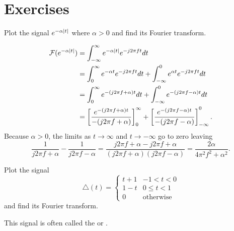 \section*{Exercises}


\begin{excersizelist}

\item \label{exer:fourtransealphaabs} Plot the signal $e^{-\alpha\left\vert t \right\vert}$ where $\alpha > 0$ and find its Fourier transform.
\begin{solution}
\begin{align*}
{\mathcal F}(e^{-\alpha\left\vert t \right\vert}) &= \int_{-\infty}^{\infty} e^{-\alpha\left\vert t \right\vert} e^{-j2\pi f t} dt \\
&= \int_{0}^{\infty} e^{-\alpha t} e^{-j2\pi f t} dt  + \int_{-\infty}^{0} e^{\alpha t} e^{-j2\pi f t} dt \\
&= \int_{0}^{\infty} e^{-(j2\pi f + \alpha)t} dt  + \int_{-\infty}^{0} e^{-(j2\pi f - \alpha) t} dt \\
&= \left[ \frac{e^{-(j2\pi f + \alpha)t}}{-(j2\pi f + \alpha)} \right]_{0}^{\infty}  + \left[ \frac{e^{-(j2\pi f - \alpha)t}}{-(j2\pi f - \alpha)} \right]_{-\infty}^{0}.
\end{align*}
Because $\alpha > 0$, the limits as $t\to\infty$ and $t\to-\infty$ go to zero leaving
\[
\frac{1}{j2\pi f + \alpha} - \frac{1}{j2\pi f - \alpha} = \frac{j2\pi f + \alpha - j2\pi f + \alpha}{(j2\pi f + \alpha)(j2\pi f - \alpha)} = \frac{2\alpha}{4\pi^2 f^2 + \alpha^2}.
\]
\end{solution}

\item \label{exer:triangle_pulse_ft} Plot the signal
\[
\bigtriangleup(t) = \begin{cases}
t + 1 & -1 < t < 0 \\
1 - t & 0 \leq t < 1 \\
0 & \text{otherwise}
\end{cases}
\]
and find its Fourier transform.
\begin{solution}
This signal is often called the  or .
\begin{center}
\end{center}


\end{solution}
\end{excersizelist}
